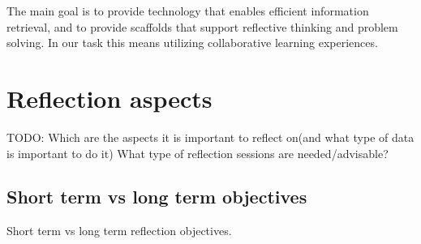 The main goal is to provide technology that enables efficient information retrieval, and to provide scaffolds that support reflective thinking and problem solving. In our task this means utilizing collaborative learning experiences. 

\section{Reflection aspects}
TODO:
Which are the aspects it is important to reflect on(and what type of data is important to do it)
What type of reflection sessions are needed/advisable?
\subsection{Short term vs long term objectives}
Short term vs long term reflection objectives. 

